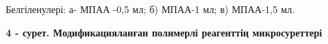 



Белгіленулері: а- МПАА -0,5 мл; б) МПАА-1 мл; в) МПАА-1,5 мл.

{\bfseries 4 - сурет. Модификацияланған полимерлі реагенттің микросуреттері}

